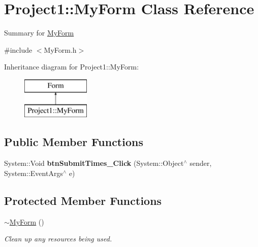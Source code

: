 \hypertarget{class_project1_1_1_my_form}{}\section{Project1\+:\+:My\+Form Class Reference}
\label{class_project1_1_1_my_form}


Summary for \mbox{\hyperlink{class_project1_1_1_my_form}{My\+Form}}  




{\ttfamily \#include $<$My\+Form.\+h$>$}

Inheritance diagram for Project1\+:\+:My\+Form\+:\begin{figure}[H]
\begin{center}
\leavevmode
\includegraphics[height=2.000000cm]{class_project1_1_1_my_form}
\end{center}
\end{figure}
\subsection*{Public Member Functions}
\begin{DoxyCompactItemize}
\item 
\mbox{\label{class_project1_1_1_my_form_ad665941610f014595ab9c9ca8e931765}} 
System\+::\+Void {\bfseries btn\+Submit\+Times\+\_\+\+Click} (System\+::\+Object$^\wedge$ sender, System\+::\+Event\+Args$^\wedge$ e)
\end{DoxyCompactItemize}
\subsection*{Protected Member Functions}
\begin{DoxyCompactItemize}
\item 
\mbox{\hyperlink{class_project1_1_1_my_form_a501b2b4481b72877fc73101f1d6f26be}{$\sim$\+My\+Form}} ()
\begin{DoxyCompactList}\small\item\em Clean up any resources being used. \end{DoxyCompactList}\end{DoxyCompactItemize}


